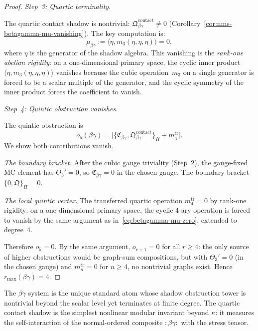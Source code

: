 \begin{proof}
\medskip
\emph{Step~3: Quartic terminality.}

The quartic contact shadow is nontrivial:
$\mathfrak{Q}^{\mathrm{contact}}_{\beta\gamma} \neq 0$
(Corollary~\ref{cor:nms-betagamma-mu-vanishing}).
The key computation is:
\begin{equation}\label{eq:betagamma-mu-zero}
\mu_{\beta\gamma}
:= \langle \eta, m_3(\eta, \eta, \eta) \rangle = 0,
\end{equation}
where $\eta$ is the generator of the shadow algebra.
This vanishing is the \emph{rank-one abelian rigidity}:
on a one-dimensional primary space, the cyclic
inner product $\langle \eta, m_3(\eta,\eta,\eta)\rangle$
vanishes because the cubic operation~$m_3$ on a single
generator is forced to be a scalar multiple of the
generator, and the cyclic symmetry of the inner product
forces the coefficient to vanish.

\medskip
\emph{Step~4: Quintic obstruction vanishes.}

The quintic obstruction is
\begin{equation}\label{eq:betagamma-quintic-obstruction}
o_5(\beta\gamma) =
\bigl[\{\mathfrak{C}_{\beta\gamma},
\mathfrak{Q}^{\mathrm{contact}}_{\beta\gamma}\}_{H}
+ m_4^{\mathrm{tr}}\bigr].
\end{equation}
We show both contributions vanish.

\emph{The boundary bracket.}
After the cubic gauge triviality (Step~2), the
gauge-fixed MC element has $\Theta_3' = 0$, so
$\mathfrak{C}_{\beta\gamma} = 0$ in the chosen gauge.
The boundary bracket $\{0, \mathfrak{Q}\}_H = 0$.

\emph{The local quintic vertex.}
The transferred quartic operation $m_4^{\mathrm{tr}} = 0$
by rank-one rigidity: on a one-dimensional primary space,
the cyclic $4$-ary operation is forced to vanish by the
same argument as in~\eqref{eq:betagamma-mu-zero},
extended to degree~$4$.

Therefore $o_5 = 0$. By the same argument, $o_{r+1} = 0$
for all $r \geq 4$: the only source of higher obstructions
would be graph-sum compositions, but with $\Theta_3' = 0$
(in the chosen gauge) and $m_n^{\mathrm{tr}} = 0$ for
$n \geq 4$, no nontrivial graphs exist. Hence
$r_{\max}(\beta\gamma) = 4$.
\end{proof}

\begin{remark}
\label{rem:betagamma-contact-atom}
The $\beta\gamma$ system is the unique standard atom
whose shadow obstruction tower is nontrivial beyond the scalar
level yet terminates at finite degree. The quartic
contact shadow is the simplest nonlinear modular
invariant beyond $\kappa$: it measures the
self-interaction of the normal-ordered composite
${:}\beta\gamma{:}$ with the stress tensor.
\end{remark}

